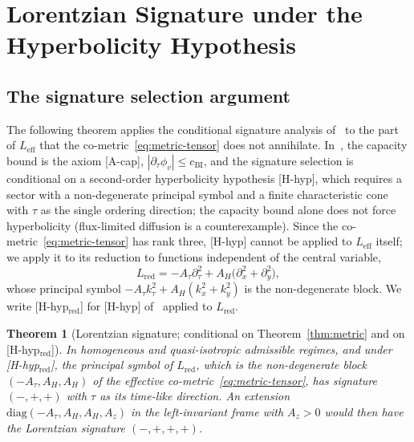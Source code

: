 \documentclass[11pt,a4paper]{article}
\newtheorem{theorem}{Theorem}[section]
\theoremstyle{definition}
\theoremstyle{remark}
\begin{document}
  \section{Lorentzian Signature under the Hyperbolicity Hypothesis}
  \label{sec:lorentz}

  \subsection{The signature selection argument}

    The following theorem applies the conditional signature analysis of~\cite{Beau2026c} to the part of
    $L_{\mathrm{eff}}$ that the co-metric~\eqref{eq:metric-tensor} does not annihilate.
    In~\cite{Beau2026c}, the capacity bound is the axiom [A-cap], $|\partial_\tau\phi_v| \le c_{\mathrm{BI}}$, and the
    signature selection is conditional on a second-order hyperbolicity hypothesis [H-hyp], which requires a sector
    with a non-degenerate principal symbol and a finite characteristic cone with $\tau$ as the single ordering
    direction; the capacity bound alone does not force hyperbolicity (flux-limited diffusion is a counterexample).
    Since the co-metric~\eqref{eq:metric-tensor} has rank three, [H-hyp] cannot be applied to $L_{\mathrm{eff}}$
    itself; we apply it to its reduction to functions independent of the central variable,
    \begin{equation}
      L_{\mathrm{red}} = -A_\tau \partial_\tau^2 + A_H\bigl(\partial_x^2 + \partial_y^2\bigr),
      \label{eq:lred}
    \end{equation}
    whose principal symbol $-A_\tau k_\tau^2 + A_H(k_x^2 + k_y^2)$ is the non-degenerate block.
    We write [H-hyp$_{\mathrm{red}}$] for [H-hyp] of~\cite{Beau2026c} applied to $L_{\mathrm{red}}$.

    \begin{theorem}[Lorentzian signature; conditional on Theorem~\ref{thm:metric} and on
      {[H-hyp$_{\mathrm{red}}$]}]
      \label{thm:lorentz}
      In homogeneous and quasi-isotropic admissible regimes, and under [H-hyp$_{\mathrm{red}}$], the principal
      symbol of $L_{\mathrm{red}}$, which is the non-degenerate block $(-A_\tau, A_H, A_H)$ of the effective
      co-metric~\eqref{eq:metric-tensor}, has signature $(-,+,+)$ with $\tau$ as its time-like direction.
      An extension $\mathrm{diag}(-A_\tau, A_H, A_H, A_z)$ in the left-invariant frame with $A_z > 0$ would then have
      the Lorentzian signature $(-,+,+,+)$.
    \end{theorem}
\end{document}
